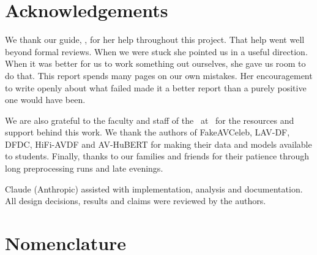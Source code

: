 \clearpage

%
%
\chapter*{Acknowledgements}

We thank our guide, \textbf{\GuideName}, for her help throughout this project.
That help went well beyond formal reviews. When we were stuck she pointed us in
a useful direction. When it was better for us to work something out ourselves,
she gave us room to do that. This report spends many pages on our own
mistakes. Her encouragement to write openly about what failed made it a better
report than a purely positive one would have been.

We are also grateful to the faculty and staff of the \Department\ at \College\
for the resources and support behind this work. We thank the authors of
FakeAVCeleb, LAV-DF, DFDC, HiFi-AVDF and AV-HuBERT for making their data and
models available to students. Finally, thanks to our families and friends for
their patience through long preprocessing runs and late evenings.

Claude (Anthropic) assisted with implementation, analysis and documentation. All design decisions, results and claims were reviewed by the authors.

\clearpage

%
%
\renewcommand{\contentsname}{Contents}
\tableofcontents
\clearpage

\listoftables
{}
\clearpage

\listoffigures
{}
\clearpage

%
%
\chapter*{Nomenclature}

